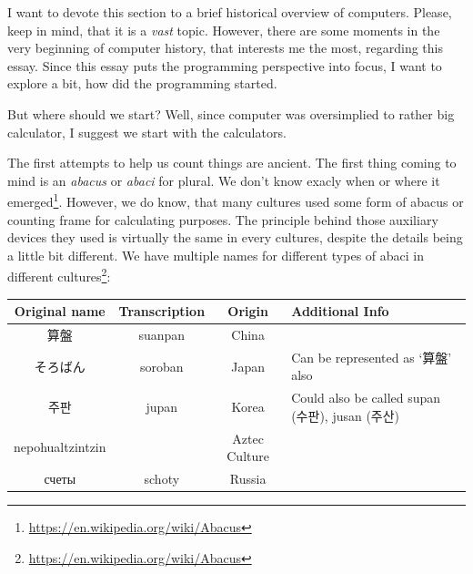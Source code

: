 \documentclass{article}
\begin{document}
            I want to devote this section to a brief historical overview of computers. Please, keep in mind, that it is a \emph{vast} topic. However, there are some moments in the very
            beginning of computer history, that interests me the most, regarding this essay. Since this essay puts the programming perspective into focus, I want to explore 
            a bit, how did the programming started. \par

            But where should we start? Well, since computer was oversimplied to rather big calculator, I suggest we start with the calculators.\par

            The first attempts to help us count things are ancient. The first thing coming to mind is an \emph{abacus} or \emph{abaci} for plural. We don't know exacly when or
            where it emerged\footnote{\href{https://en.wikipedia.org/wiki/Abacus}{https://en.wikipedia.org/wiki/Abacus}}. However, we do know, that many cultures used some form
            of abacus or counting frame for calculating purposes. The principle behind those auxiliary devices they used is virtually the same in every cultures, despite the 
            details being a little bit different. We have multiple names for different types of abaci in different
            cultures\footnote{\href{https://en.wikipedia.org/wiki/Abacus}{https://en.wikipedia.org/wiki/Abacus}}:
            
            \begin{longtable} {|c|c|c|p{4cm}|}
                \hline
                Original name & Transcription & Origin & Additional Info \\\hline
                算盤 & suanpan & China & \\\hline
                そろばん & soroban & Japan & Can be represented as `算盤' also \\\hline
                주판 & jupan & Korea & Could also be called supan (수판), jusan (주산) \\\hline
                nepohualtzintzin & & Aztec Culture & \\\hline
                счеты & schoty & Russia & \\\hline
            \end{longtable}
\end{document}
